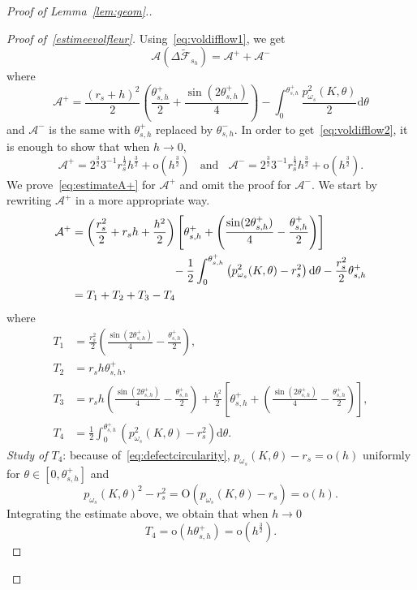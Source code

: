 \documentclass[10pt]{amsart}
\theoremstyle{definition}\newtheorem{defi}[theo]{Definition}\newtheorem{rema}[theo]{Remark}\newtheorem{exam}[theo]{Example}\newtheorem{exem}[theo]{Example}\newtheorem{nota}[theo]{Notation}
\newcommand{\cA}{\mathcal{A}}
\newcommand{\cF}{\mathcal{F}}
\newcommand{\dd}{\mathrm{d}}
\newcommand{\od}{\mathrm{o}}
\newcommand{\Odd}{\mathrm{O}}
\newcommand{\pass}{\vspace{0.3cm}\noindent}
\newenvironment*{prooff}{\begin{proof}}{\let\qed\relax\end{proof}}
\begin{document}
\begin{proof}[{Proof of Lemma~\ref{lem:geom}.}]
\begin{prooff}[{Proof of~\eqref{estimeevolfleur}}]
Using~\eqref{eq:voldifflow1}, we get
\[
\cA\left(\Delta\widetilde{\cF}_{s_h}\right)= {\cA}^++{\cA}^-
\]
where
\[
\cA^+=\frac{(r_s+h)^2}{2}\left(\frac{\theta_{s,h}^+}{2}+\frac{\sin (2\theta_{s,h}^+)}{4}\right)-\int_0^{\theta_{s,h}^+}\frac{p_{\omega_s}^2(K,\theta)}{2}\dd\theta
\]
and $\cA^-$ is the same with $\theta_{s,h}^+$ replaced by $\theta_{s,h}^-$. In order to get~\eqref{eq:voldifflow2}, it is enough to show that when $h\to 0$,
\begin{equation}\label{eq:estimateA+}
\cA^+=2^{\frac32}3^{-1}r_s^{\frac12}h^{\frac32}+\od\left(h^{\frac32}\right)\;\;\text{ and } \;\;\cA^-=2^{\frac32}3^{-1}r_s^{\frac12}h^{\frac32}+\od\left(h^{\frac32}\right).
\end{equation}
We prove~\eqref{eq:estimateA+} for $\cA^+$ and omit the proof for $\cA^-$. We start by rewriting $\cA^+$ in a more appropriate way.
\begin{equation}\label{eq:rewritingA+}
\begin{aligned}
\cA^+&=\left(\frac{r_s^2}{2}+r_sh+\frac{h^2}{2}\right)\left[\theta_{s,h}^++\left(\frac{\sin(2\theta_{s,h}^+)}{4}-\frac{\theta_{s,h}^+}{2}\right)\right]\\
&\mkern160mu-\frac{1}{2} \int_0^{\theta_{s,h}^+}\left(p_{\omega_s}^2(K,\theta)-r_s^2\right)\dd\theta -\frac{r_s^2}{2}\theta_{s,h}^+
\\
&=T_1+T_2+T_3-T_4 
\end{aligned}
\end{equation}
where
\begin{align*}
T_1&=\frac{r_s^2}{2}\left(\frac{\sin (2\theta_{s,h}^+)}{4}-\frac{\theta_{s,h}^+}{2}\right),\\
T_2&=r_sh\theta_{s,h}^+,\\
T_3&=r_sh\left(\frac{\sin (2\theta_{s,h}^+)}{4}-\frac{\theta_{s,h}^+}{2}\right)+ \frac{h^2}{2}\left[\theta_{s,h}^++\left(\frac{\sin (2\theta_{s,h}^+)}{4}-\frac{\theta_{s,h}^+}{2}\right)\right],\\
T_4&=\frac{1}{2} \int_0^{\theta_{s,h}^+}\left(p_{\omega_s}^2(K,\theta)-r_s^2\right)\dd\theta.
\end{align*}
\noindent \emph{Study of $T_4$}: because of~\eqref{eq:defectcircularity}, $p_{\omega_s}(K,\theta)-r_s=\od(h)$ uniformly for $\theta\in [0,\theta_{s,h}^+]$ and
\[
p_{\omega_s}(K,\theta)^2-r_s^2=\Odd(p_{\omega_s}(K,\theta)-r_s)=\od(h).
\]
Integrating the estimate above, we obtain that when $h\to 0$
\begin{equation}\label{eq:estimT4}
T_4=\od\left(h\theta_{s,h}^+\right)=\od\left(h^{\frac32}\right).
\end{equation}



\end{prooff}
\end{proof}
\end{document}
